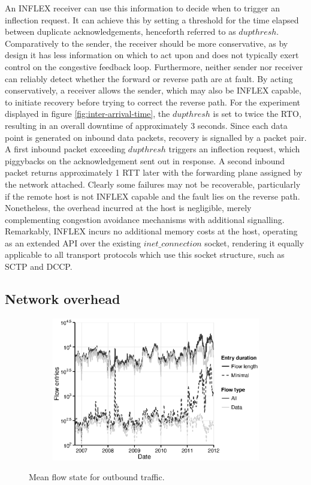 An INFLEX receiver can use this information to decide when to trigger an inflection request. 
It can achieve this by setting a threshold for the time elapsed between duplicate acknowledgements, henceforth referred to as $dupthresh$.
Comparatively to the sender, the receiver should be more conservative, as by design it has less information on which to act upon and does not typically exert control on the congestive feedback loop.
Furthermore, neither sender nor receiver can reliably detect whether the forward or reverse path are at fault.
By acting conservatively, a receiver allows the sender, which may also be INFLEX capable, to initiate recovery before trying to correct the reverse path.
For the experiment displayed in figure \ref{fig:inter-arrival-time}, the $dupthresh$ is set to twice the \ac{RTO}, resulting in an overall downtime of approximately 3 seconds.
Since each data point is generated on inbound data packets, recovery is signalled by a packet pair.
A first inbound packet exceeding $dupthresh$ triggers an inflection request, which piggybacks on the acknowledgement sent out in response.
A second inbound packet returns approximately 1 RTT later with the forwarding plane assigned by the network attached.
Clearly some failures may not be recoverable, particularly if the remote host is not INFLEX capable and the fault lies on the reverse path.
Nonetheless, the overhead incurred at the host is negligible, merely complementing congestion avoidance mechanisms with additional signalling.
Remarkably, INFLEX incurs no additional memory costs at the host, operating as an extended \ac{API} over the existing $inet\_connection$ socket, rendering it equally applicable to all transport protocols which use this socket structure, such as \ac{SCTP} and \ac{DCCP}.

\subsection{Network overhead}

\begin{figure}
    \begin{subfigure}[b]{1.0\linewidth}
        \centering
        \includegraphics[width=5.0in]{figures/inflex/flow.eps}
    \end{subfigure}%
    \caption{Mean flow state for outbound traffic\label{fig:flow}.}
\end{figure}

